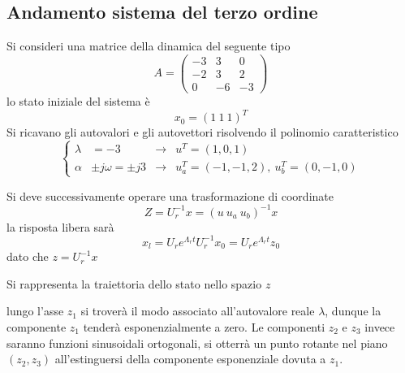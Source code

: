 
\subsection{Andamento sistema del terzo ordine}
Si consideri una matrice della dinamica del seguente tipo
$$
A = \begin{pmatrix}
-3 & 3 & 0\\
-2 & 3 & 2\\
0  & -6 & -3
\end{pmatrix}
$$
lo stato iniziale del sistema è
$$
x_0 = (1 \ 1\ 1)^T
$$
Si ricavano gli autovalori e gli autovettori risolvendo il polinomio
caratteristico
$$
\left\{\begin{aligned}
\lambda &= -3 &\rightarrow& u^T=(1, 0, 1)\\
\alpha &\pm j\omega = \pm j3 &\rightarrow& u_a^T=(-1, -1 , 2),\ u_b^T = (0, -1 ,
0)
\end{aligned}\right.
$$

Si deve successivamente operare una trasformazione di coordinate
$$
Z = U_r^{-1}x = (u\ u_a \ u_b)^{-1}x
$$
la risposta libera sarà
$$
x_l = U_re^{\Lambda_r t}U_r^{-1} x_0 = U_r e^{\Lambda_r t} z_0
$$
dato che $z = U_r^{-1} x$

Si rappresenta la traiettoria dello stato nello spazio $z$

\begin{figure}[H]
 \centering
\end{figure}

lungo l'asse $z_1$ si troverà il modo associato all'autovalore reale $\lambda$,
dunque la componente $z_1$ tenderà esponenzialmente a zero.
Le componenti $z_2$ e $z_3$ invece saranno funzioni sinusoidali ortogonali, si
otterrà un punto rotante nel piano $(z_2,z_3)$ all'estinguersi della componente
esponenziale dovuta a $z_1$.

